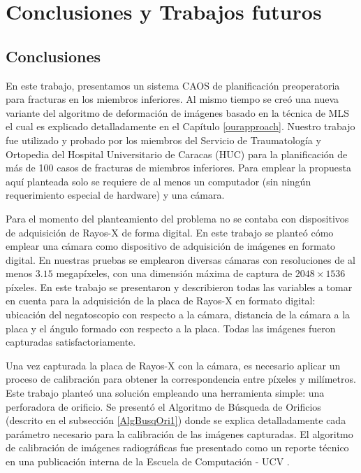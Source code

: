 \chapter{Conclusiones y Trabajos futuros}

\section{Conclusiones}

En este trabajo, presentamos un sistema CAOS de planificaci\'on preoperatoria para fracturas en los miembros inferiores. Al mismo tiempo se cre\'o una nueva variante del algoritmo de deformaci\'on de im\'agenes basado en la t\'ecnica de MLS el cual es explicado detalladamente en el Cap\'itulo \ref{ourapproach}. Nuestro trabajo fue utilizado y probado por los miembros del Servicio de Traumatolog\'ia y Ortopedia del Hospital Universitario de Caracas (HUC) \cite{REF_HUC} para la planificaci\'on de m\'as de 100 casos de fracturas de miembros inferiores. Para emplear la propuesta aqu\'i planteada solo se requiere de al menos un computador (sin ning\'un requerimiento especial de hardware) y una c\'amara.

Para el momento del planteamiento del problema no se contaba con dispositivos de adquisici\'on de Rayos-X de forma digital. En este trabajo se plante\'o c\'omo emplear una c\'amara como dispositivo de adquisici\'on de im\'agenes en formato digital. En nuestras pruebas se emplearon diversas c\'amaras con resoluciones de al menos $3.15$ megap\'ixeles, con una dimensi\'on m\'axima de captura de $2048 \times 1536$ p\'ixeles. En este trabajo se presentaron y describieron todas las variables a tomar en cuenta para la adquisici\'on de la placa de Rayos-X en formato digital: ubicaci\'on del negatoscopio con respecto a la c\'amara, distancia de la c\'amara a la placa y el \'angulo formado con respecto a la placa. Todas las im\'agenes fueron capturadas satisfactoriamente.

Una vez capturada la placa de Rayos-X con la c\'amara, es necesario aplicar un proceso de calibraci\'on para obtener la correspondencia entre p\'ixeles y mil\'imetros. Este trabajo plante\'o una soluci\'on empleando una herramienta simple: una perforadora de orificio. Se present\'o el Algoritmo de B\'usqueda de Orificios (descrito en el subsecci\'on \ref{AlgBusqOri1}) donde se explica detalladamente cada par\'ametro necesario para la calibraci\'on de las im\'agenes capturadas. El algoritmo de calibraci\'on de im\'agenes radiogr\'aficas fue presentado como un reporte t\'ecnico en una publicaci\'on interna de la Escuela de Computaci\'on - UCV \cite{RAM_TEC10}.

